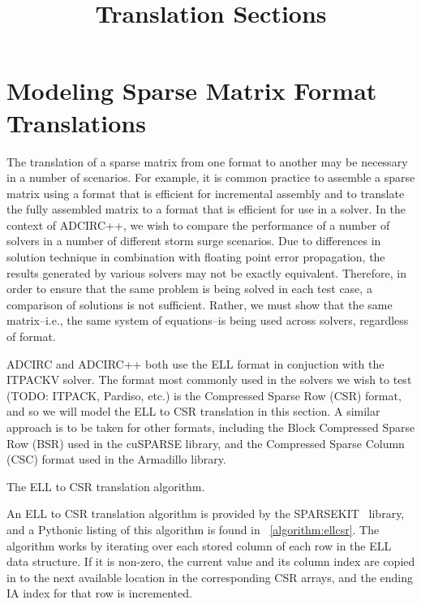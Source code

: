 \documentclass[sigconf]{acmart}
\begin{document}
\pagestyle{plain}
\title{Translation Sections}
\maketitle

\section{Modeling Sparse Matrix Format Translations}

The translation of a sparse matrix from one format to another may be necessary in a number of scenarios.  For example, it is common practice to assemble a sparse matrix using a format that is efficient for incremental assembly and to translate the fully assembled matrix to a format that is efficient for use in a solver.  In the context of ADCIRC++, we wish to compare the performance of a number of solvers in a number of different storm surge scenarios.  
Due to differences in solution technique in combination with floating point error propagation, the results generated by various solvers may not be exactly equivalent.  Therefore, in order to ensure that the same problem is being solved in each test case, a comparison of solutions is not sufficient.  Rather, we must show that the same matrix--i.e., the same system of equations--is being used across solvers, regardless of format.

ADCIRC and ADCIRC++ both use the ELL format in conjuction with the ITPACKV solver.  The format most commonly used in the solvers we wish to test (TODO: ITPACK, Pardiso, etc.) is the Compressed Sparse Row (CSR) format, and so we will model the ELL to CSR translation in this section.  A similar approach is to be taken for other formats, including the Block Compressed Sparse Row (BSR) used in the cuSPARSE library, and the Compressed Sparse Column (CSC) format used in the Armadillo library.

\LinesNumbered
\begin{algorithm}

\caption{The ELL to CSR translation algorithm.}
\label{algorithm:ellcsr}
\end{algorithm}
\LinesNotNumbered

An ELL to CSR translation algorithm is provided by the SPARSEKIT~\cite{sparsekit} library, and a Pythonic listing of this algorithm is found in \figurename~\ref{algorithm:ellcsr}.  The algorithm works by iterating over each stored column of each row in the ELL data structure.  If it is non-zero, the current value and its column index are copied in to the next available location in the corresponding CSR arrays, and the ending IA index for that row is incremented.
\end{document}
